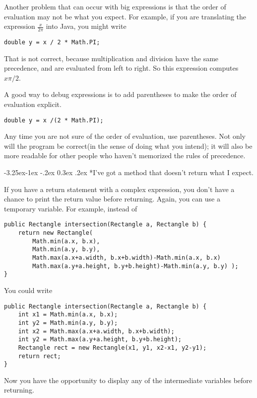 \documentclass{book}
\makeatletter
\renewcommand\subsection{\@startsection {subsection}{2}{0mm}%
    {-3.25ex\@plus -1ex \@minus -.2ex}%
    {0.3ex \@plus .2ex}%
    {\normalfont\large\bfseries}}
\makeatother
\begin{document}

Another problem that can occur with big expressions is
that the order of evaluation may not be what you expect.
For example, if you are translating the expression
$\frac{x}{2 \pi}$ into Java, you might write

\begin{verbatim}
double y = x / 2 * Math.PI;
\end{verbatim}
%
That is not correct, because multiplication and division have
the same precedence, and are evaluated from left to right.
So this expression computes $x \pi / 2$.

A good way to debug expressions is to add parentheses to make
the order of evaluation explicit.

\begin{verbatim}
double y = x /(2 * Math.PI);
\end{verbatim}
%
Any time you are not sure of the order of evaluation, use
parentheses.  Not only will the program be correct(in the sense
of doing what you intend); it will also be more readable for
other people who haven't memorized the rules of precedence.



\subsection*{I've got a method that doesn't return what I
expect.}

If you have a return statement with a complex expression,
you don't have a chance to print the return value before
returning.  Again, you can use a temporary variable.  For
example, instead of

\begin{verbatim}
public Rectangle intersection(Rectangle a, Rectangle b) { 
    return new Rectangle(
        Math.min(a.x, b.x),
        Math.min(a.y, b.y),
        Math.max(a.x+a.width, b.x+b.width)-Math.min(a.x, b.x)
        Math.max(a.y+a.height, b.y+b.height)-Math.min(a.y, b.y) );
}
\end{verbatim}
%
You could write

\begin{verbatim}
public Rectangle intersection(Rectangle a, Rectangle b) { 
    int x1 = Math.min(a.x, b.x);
    int y2 = Math.min(a.y, b.y);
    int x2 = Math.max(a.x+a.width, b.x+b.width);
    int y2 = Math.max(a.y+a.height, b.y+b.height);
    Rectangle rect = new Rectangle(x1, y1, x2-x1, y2-y1);
    return rect;
}
\end{verbatim}
%
Now you have the opportunity to display any of
the intermediate variables before returning.
\end{document}

